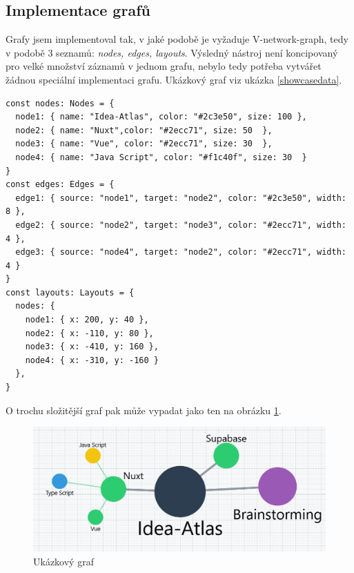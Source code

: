 \subsection{Implementace grafů}
Grafy jsem implementoval tak, v jaké podobě je vyžaduje V-network-graph, tedy v podobě 3 seznamů: \textit{nodes, edges, layouts}. Výsledný nástroj není koncipovaný pro velké množství záznamů v jednom grafu, nebylo tedy potřeba vytvářet žádnou speciální implementaci grafu. Ukázkový graf viz ukázka \ref{showcasedata}.
\newpage
\begin{lstlisting}[style=JavaScript, firstnumber = 1, caption={ Implemetnace ukázkového grafu},
label={showcasedata}]
const nodes: Nodes = {
  node1: { name: "Idea-Atlas", color: "#2c3e50", size: 100 },
  node2: { name: "Nuxt",color: "#2ecc71", size: 50  },
  node3: { name: "Vue", color: "#2ecc71", size: 30  },
  node4: { name: "Java Script", color: "#f1c40f", size: 30  }
}
const edges: Edges = {
  edge1: { source: "node1", target: "node2", color: "#2c3e50", width: 8 },
  edge2: { source: "node2", target: "node3", color: "#2ecc71", width: 4 },
  edge3: { source: "node4", target: "node2", color: "#2ecc71", width: 4 }
}
const layouts: Layouts = {
  nodes: {
    node1: { x: 200, y: 40 },
    node2: { x: -110, y: 80 },
    node3: { x: -410, y: 160 },
    node4: { x: -310, y: -160 }
  },
}
\end{lstlisting}
O trochu složitější graf pak může vypadat jako ten na obrázku \ref{fig:graph}.
\begin{figure}[h]
    \centering
    \includegraphics[width=1\linewidth]{Images/graph.png}
    \caption{Ukázkový graf}
    \label{fig:graph}
\end{figure}
